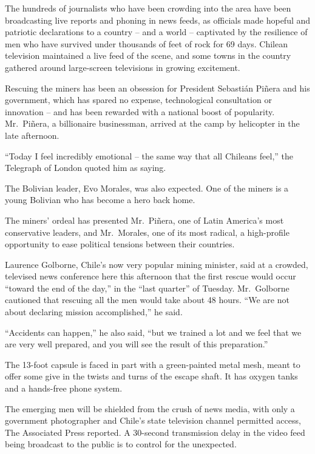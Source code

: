 ﻿\documentclass[12pt]{article}
\begin{document}
The hundreds of journalists who have been crowding into the area have been broadcasting live reports
and phoning in news feeds, as officials made hopeful and patriotic declarations to a country -- and
a world -- captivated by the resilience of men who have survived under thousands of feet of rock for
69 days. Chilean television maintained a live feed of the scene, and some towns in the country
gathered around large-screen televisions in growing excitement.

Rescuing the miners has been an obsession for President Sebasti\'an Pi\~{n}era and his government,
which has spared no expense, technological consultation or innovation -- and has been rewarded with
a national boost of popularity. Mr.~Pi\~{n}era, a billionaire businessman, arrived at the camp by
helicopter in the late afternoon.

``Today I feel incredibly emotional -- the same way that all Chileans feel,'' the Telegraph of
London quoted him as saying.

The Bolivian leader, Evo Morales, was also expected. One of the miners is a young Bolivian who has
become a hero back home.

The miners' ordeal has presented Mr.~Pi\~{n}era, one of Latin America's most conservative leaders,
and Mr.~Morales, one of its most radical, a high-profile opportunity to ease political tensions
between their countries.

Laurence Golborne, Chile's now very popular mining minister, said at a crowded, televised news
conference here this afternoon that the first rescue would occur ``toward the end of the day,'' in
the ``last quarter'' of Tuesday. Mr.~Golborne cautioned that rescuing all the men would take about
48 hours. ``We are not about declaring mission accomplished,'' he said.

``Accidents can happen,'' he also said, ``but we trained a lot and we feel that we are very well
prepared, and you will see the result of this preparation.''

The 13-foot capsule is faced in part with a green-painted metal mesh, meant to offer some give in
the twists and turns of the escape shaft. It has oxygen tanks and a hands-free phone system.

The emerging men will be shielded from the crush of news media, with only a government photographer
and Chile's state television channel permitted access, The Associated Press reported. A 30-second
transmission delay in the video feed being broadcast to the public is to control for the unexpected.
\end{document}
